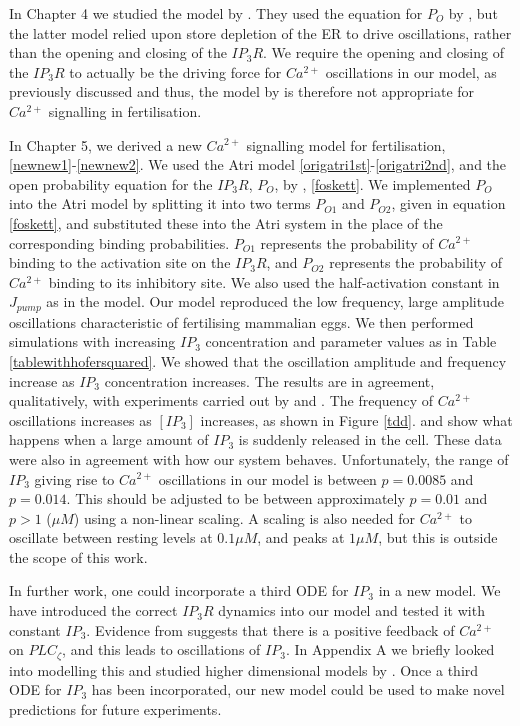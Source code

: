 In Chapter 4 we studied the model by . They used the equation for $P_O$ by , but the latter model relied upon store depletion of the ER to drive oscillations, rather than the opening and closing of the $IP_3R$. We require the opening and closing of the $IP_3R$ to actually be the driving force for $Ca^{2+}$ oscillations in our model, as previously discussed and thus, the model by  is therefore not appropriate for $Ca^{2+}$ signalling in fertilisation.

In Chapter 5, we derived a new $Ca^{2+}$ signalling model for fertilisation, \eqref{newnew1}-\eqref{newnew2}. We used the Atri model \eqref{origatri1st}-\eqref{origatri2nd}, and the open probability equation for the $IP_3R$, $P_O$, by , \eqref{foskett}. We implemented $P_O$ into the Atri model by splitting it into two terms $P_{O1}$ and $P_{O2}$, given in equation \eqref{foskett}, and substituted these into the Atri system in the place of the corresponding binding probabilities. $P_{O1}$ represents the probability of $Ca^{2+}$ binding to the activation site on the $IP_3R$, and $P_{O2}$ represents the probability of $Ca^{2+}$ binding to its inhibitory site. We also used the
half-activation constant in $J_{pump}$ as in the  model. Our model reproduced
the low frequency, large amplitude oscillations characteristic of fertilising mammalian eggs. We then performed simulations with increasing $IP_3$ concentration and parameter values as in Table \ref{tablewithhofersquared}. We showed that the oscillation amplitude and frequency increase as $IP_3$ concentration increases. The results are in agreement, qualitatively, with experiments carried out by  and . The frequency of $Ca^{2+}$ oscillations increases as $[IP_3]$ increases, as shown in Figure \ref{tdd}.  and  show what happens when a large amount of $IP_3$ is suddenly released in the cell. These data were also in agreement with how our system behaves. Unfortunately, the range of $IP_3$ giving rise to $Ca^{2+}$ oscillations in our model is between $p=0.0085$ and $p=0.014$. This should be adjusted to be between approximately $p=0.01$ and $p>1$ ($\mu M$) \cite{Mak1998, karl} using a non-linear scaling. A scaling is also needed for $Ca^{2+}$ to oscillate between resting levels at $0.1 \mu M$, and peaks at $1 \mu M$, but this is outside the scope of this work.

In further work, one could incorporate a third ODE for $IP_3$ in a new model. We have introduced the correct $IP_3R$ dynamics into our model and tested it with constant $IP_3$. Evidence from  suggests that there is a positive feedback of $Ca^{2+}$ on $PLC_{\zeta}$, and this leads to oscillations of $IP_3$. In Appendix A we briefly looked into modelling this and studied higher dimensional models by . {Once a third ODE for $IP_3$ has been incorporated, our new model could be used to make novel predictions for future experiments. }

